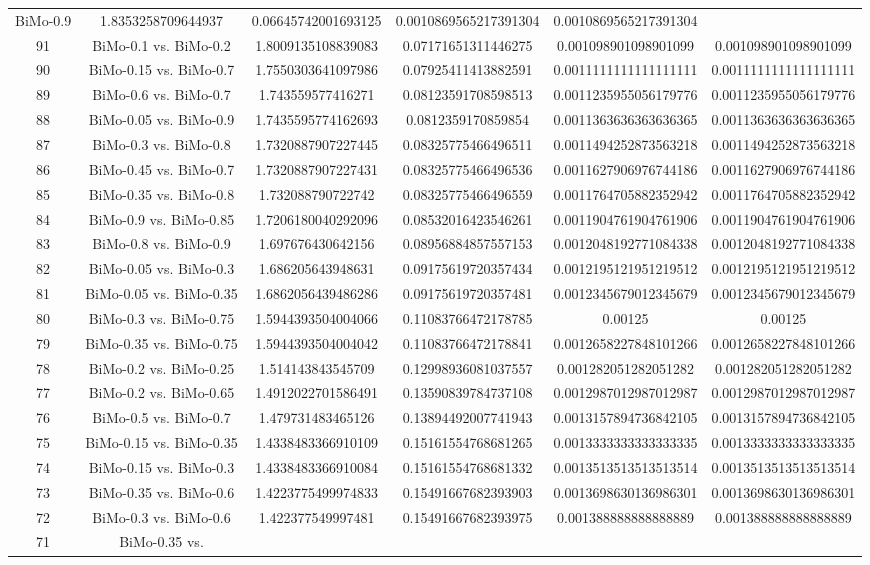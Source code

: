 \documentclass[a4paper,10pt]{article}
\begin{document}
\begin{landscape}
\begin{table}[!htp]
\begin{tabular}{cccccc}
BiMo-0.9&1.8353258709644937&0.06645742001693125&0.0010869565217391304&0.0010869565217391304\\91&BiMo-0.1 vs. BiMo-0.2&1.8009135108839083&0.07171651311446275&0.001098901098901099&0.001098901098901099\\90&BiMo-0.15 vs. BiMo-0.7&1.7550303641097986&0.07925411413882591&0.0011111111111111111&0.0011111111111111111\\89&BiMo-0.6 vs. BiMo-0.7&1.743559577416271&0.08123591708598513&0.0011235955056179776&0.0011235955056179776\\88&BiMo-0.05 vs. BiMo-0.9&1.7435595774162693&0.0812359170859854&0.0011363636363636365&0.0011363636363636365\\87&BiMo-0.3 vs. BiMo-0.8&1.7320887907227445&0.08325775466496511&0.0011494252873563218&0.0011494252873563218\\86&BiMo-0.45 vs. BiMo-0.7&1.7320887907227431&0.08325775466496536&0.0011627906976744186&0.0011627906976744186\\85&BiMo-0.35 vs. BiMo-0.8&1.732088790722742&0.08325775466496559&0.0011764705882352942&0.0011764705882352942\\84&BiMo-0.9 vs. BiMo-0.85&1.7206180040292096&0.08532016423546261&0.0011904761904761906&0.0011904761904761906\\83&BiMo-0.8 vs. BiMo-0.9&1.697676430642156&0.08956884857557153&0.0012048192771084338&0.0012048192771084338\\82&BiMo-0.05 vs. BiMo-0.3&1.686205643948631&0.09175619720357434&0.0012195121951219512&0.0012195121951219512\\81&BiMo-0.05 vs. BiMo-0.35&1.6862056439486286&0.09175619720357481&0.0012345679012345679&0.0012345679012345679\\80&BiMo-0.3 vs. BiMo-0.75&1.5944393504004066&0.11083766472178785&0.00125&0.00125\\79&BiMo-0.35 vs. BiMo-0.75&1.5944393504004042&0.11083766472178841&0.0012658227848101266&0.0012658227848101266\\78&BiMo-0.2 vs. BiMo-0.25&1.514143843545709&0.12998936081037557&0.001282051282051282&0.001282051282051282\\77&BiMo-0.2 vs. BiMo-0.65&1.4912022701586491&0.13590839784737108&0.0012987012987012987&0.0012987012987012987\\76&BiMo-0.5 vs. BiMo-0.7&1.479731483465126&0.13894492007741943&0.0013157894736842105&0.0013157894736842105\\75&BiMo-0.15 vs. BiMo-0.35&1.4338483366910109&0.15161554768681265&0.0013333333333333335&0.0013333333333333335\\74&BiMo-0.15 vs. BiMo-0.3&1.4338483366910084&0.15161554768681332&0.0013513513513513514&0.0013513513513513514\\73&BiMo-0.35 vs. BiMo-0.6&1.4223775499974833&0.15491667682393903&0.0013698630136986301&0.0013698630136986301\\72&BiMo-0.3 vs. BiMo-0.6&1.422377549997481&0.15491667682393975&0.001388888888888889&0.001388888888888889\\71&BiMo-0.35 vs. 
\end{tabular}
\end{table}
\end{landscape}
\end{document}
